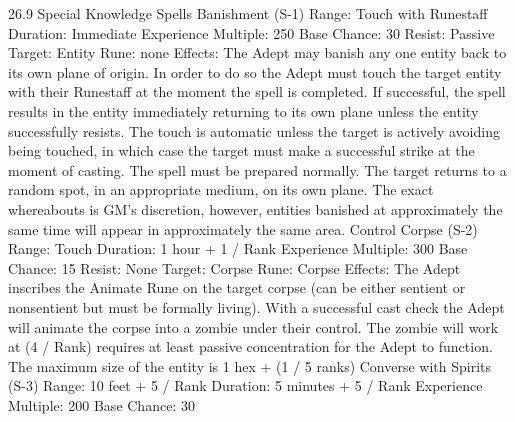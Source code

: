 \documentclass[a4paper]{article}
\begin{document}
\begin{multicols}{3}
26.9 Special Knowledge Spells
Banishment (S-1)
Range: Touch with Runestaff
Duration: Immediate
Experience Multiple: 250
Base Chance: 30%
Resist: Passive
Target: Entity
Rune: none
Effects: The Adept may banish any one entity back
to its own plane of origin. In order to do so the
Adept must touch the target entity with their
Runestaff at the moment the spell is completed. If
successful, the spell results in the entity immediately returning to its own plane unless the entity
successfully resists. The touch is automatic unless
the target is actively avoiding being touched, in
which case the target must make a successful strike
at the moment of casting. The spell must be prepared normally. The target returns to a random
spot, in an appropriate medium, on its own plane.
The exact whereabouts is GM’s discretion, however, entities banished at approximately the same
time will appear in approximately the same area.
Control Corpse (S-2)
Range: Touch
Duration: 1 hour + 1 / Rank
Experience Multiple: 300
Base Chance: 15%
Resist: None
Target: Corpse
Rune: Corpse
Effects: The Adept inscribes the Animate Rune on
the target corpse (can be either sentient or nonsentient but must be formally living). With a successful cast check the Adept will animate the
corpse into a zombie under their control. The zombie will work at (4 / Rank)%
requires at least passive concentration for the
Adept to function. The maximum size of the entity
is 1 hex + (1 / 5 ranks)
Converse with Spirits (S-3)
Range: 10 feet + 5 / Rank
Duration: 5 minutes + 5 / Rank
Experience Multiple: 200
Base Chance: 30%


\end{multicols}
\end{document}
